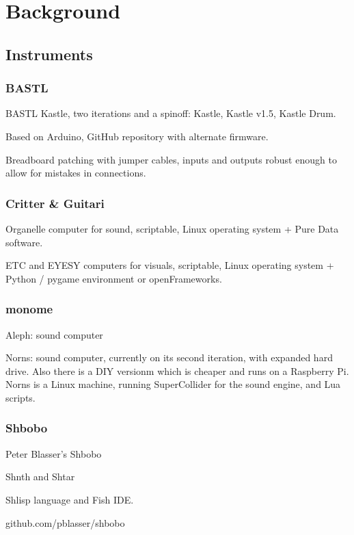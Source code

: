 \chapter{Background}

\section{Instruments}

\subsection{BASTL}

BASTL Kastle, two iterations and a spinoff: Kastle, Kastle v1.5, Kastle Drum. 

Based on Arduino, GitHub repository with alternate firmware.

Breadboard patching with jumper cables, inputs and outputs robust enough to allow for mistakes in connections.

\subsection{Critter \& Guitari}

Organelle computer for sound, scriptable, Linux operating system + Pure Data software.

ETC and EYESY computers for visuals, scriptable, Linux operating system + Python / pygame environment or openFrameworks.

\subsection{monome}

Aleph: sound computer

Norns: sound computer, currently on its second iteration, with expanded hard drive. Also there is a DIY versionm which is cheaper and runs on a Raspberry Pi.
Norns is a Linux machine, running SuperCollider for the sound engine, and Lua scripts.

\subsection{Shbobo}

Peter Blasser's Shbobo

Shnth and Shtar

Shlisp language and Fish IDE.

github.com/pblasser/shbobo

